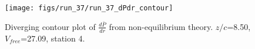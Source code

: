 \begin{figure}[H]
\centering
\texttt{[image: figs/run\_37/run\_37\_dPdr\_contour]}
\caption{Diverging contour plot of $\frac{d\bar{P}}{dr}$ from non-equilibrium theory. $z/c$=8.50, $V_{free}$=27.09, station 4.}
\label{fig:run_37_dPdr_contour}
\end{figure}


